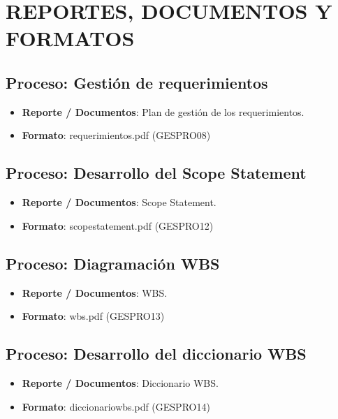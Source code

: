 \chapter{REPORTES, DOCUMENTOS Y FORMATOS}
%
\section{Proceso: Gesti\'on de requerimientos}
%
\begin{itemize}
	\item \textbf{Reporte / Documentos}: Plan de gesti\'on de los requerimientos.
	\item \textbf{Formato}: requerimientos.pdf (GESPRO08)
\end{itemize}
%
%
\section{Proceso: Desarrollo del Scope Statement}
%
\begin{itemize}
	\item \textbf{Reporte / Documentos}: Scope Statement.
	\item \textbf{Formato}: scopestatement.pdf (GESPRO12)
\end{itemize}
%
\section{Proceso: Diagramaci\'on WBS}
%
\begin{itemize}
	\item \textbf{Reporte / Documentos}: WBS.
	\item \textbf{Formato}: wbs.pdf (GESPRO13)
\end{itemize}
%
\section{Proceso: Desarrollo del diccionario WBS}
%
\begin{itemize}
	\item \textbf{Reporte / Documentos}: Diccionario WBS.
	\item \textbf{Formato}: diccionariowbs.pdf (GESPRO14)
\end{itemize}